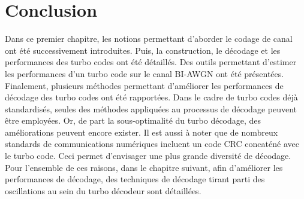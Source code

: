 

\section{Conclusion}
Dans ce premier chapitre, les notions permettant d'aborder le codage de canal ont été successivement introduites. Puis, la 
construction, le décodage et les performances des turbo codes ont été détaillés. Des outils permettant d'estimer les 
performances d'un turbo code sur le canal BI-AWGN ont été présentées. Finalement, plusieurs méthodes permettant d'améliorer 
les performances de décodage des turbo codes ont été rapportées. Dans le cadre de turbo codes déjà standardisés, seules 
des méthodes appliquées au processus de décodage peuvent être employées. Or, de part la sous-optimalité du turbo décodage, 
des améliorations peuvent encore exister. Il est aussi à noter que de nombreux standards de communications numériques 
incluent un code CRC concaténé avec le turbo code. Ceci permet d'envisager une plus grande diversité de décodage. Pour 
l'ensemble de ces raisons, dans le chapitre suivant, afin d'améliorer les performances de décodage, des techniques de 
décodage tirant parti des oscillations au sein du turbo décodeur sont détaillées. 